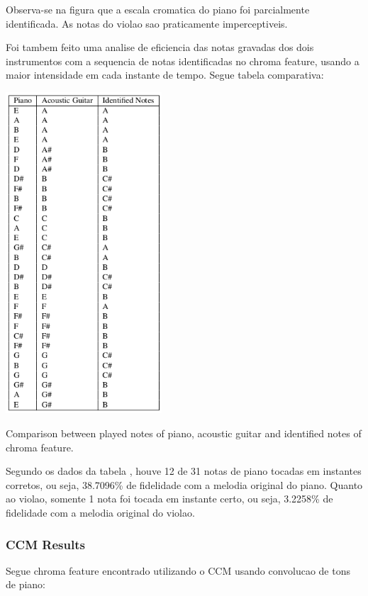 \documentclass{article}
\begin{document}
	Observa-se na figura  que a escala cromatica do piano foi parcialmente identificada. As notas do violao sao praticamente imperceptiveis.

	Foi tambem feito uma analise de eficiencia das notas gravadas dos dois instrumentos com a sequencia de notas identificadas no chroma feature, usando a maior intensidade em cada instante de tempo. Segue tabela comparativa:

	\begin{table}[h]
	 \begin{center}
	 	\centerline{
	 \includegraphics[width=\columnwidth,height=12cm]{figs/tabela_2.png}}
	 \end{center}
	 \caption{Comparison between played notes of piano, acoustic guitar and identified notes of chroma feature.}
	 \label{tab:table-2-sfft}
	\end{table}

	Segundo os dados da tabela , houve 12 de 31 notas de piano tocadas em instantes corretos, ou seja, 38.7096\% de fidelidade com a melodia original do piano. Quanto ao violao, somente 1 nota foi tocada em instante certo, ou seja, 3.2258\% de fidelidade com a melodia original do violao.


	\subsubsection{CCM Results}
	Segue chroma feature encontrado utilizando o CCM usando convolucao de tons de piano:
	
\end{document}

